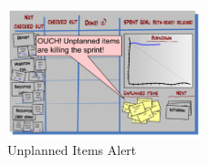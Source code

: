 \begin{figure}[H]
\centering
\includegraphics[width=0.5\textwidth]{figures/unplannedAlert.png}
\caption{Unplanned Items Alert}
\end{figure}




\clearpage